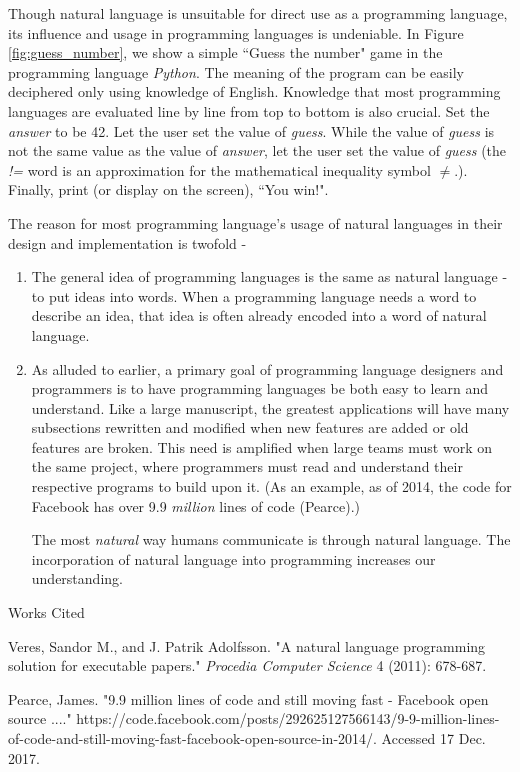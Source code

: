 \documentclass[12pt]{article}
\newcommand{\bibent}{\noindent \hangindent 40pt}
\newenvironment{workscited}{\newpage \begin{center} Works Cited \end{center}}{\newpage }
\begin{document}
\begin{flushleft}
Though natural language is unsuitable for direct use as a programming
language, its influence and usage in programming languages is undeniable.
In Figure \ref{fig:guess_number}, we show a simple ``Guess the number" game
in the programming language \textit{Python}.
The meaning of the program can be easily deciphered only using knowledge
of English. Knowledge that most programming languages are evaluated line
by line from top to bottom is also crucial. Set the \textit{answer} to be 42.
Let the user set the value of \textit{guess}.
While the value of \textit{guess} is not the same value
as the value of \textit{answer},
let the user set the value of \textit{guess} (the \textit{!=} word is an approximation
for the mathematical inequality symbol $\neq$.).
Finally, print (or display on the screen), ``You win!".

The reason for most programming language's usage of natural languages
in their design and implementation is twofold - 
\begin{enumerate}
\item The general idea of programming languages is the same as natural
language - to put ideas into words. When a programming language needs
a word to describe an idea, that idea is often already encoded into
a word of natural language.
\item As alluded to earlier, a primary goal of programming language
designers and programmers is to have programming languages be both easy to
learn and understand. Like a large manuscript, the greatest applications
will have many subsections rewritten and modified when new features are
added or old features are broken. This need is amplified when large
teams must work on the same project, where programmers must read and
understand their respective programs to build upon it.
(As an example, as of 2014, the code
for Facebook has over 9.9 \textit{million} lines of code (Pearce).)

The most \textit{natural} way humans communicate is through natural
language. The incorporation of natural language into programming
increases our understanding.
\end{enumerate}

\newpage

\begin{workscited}

\bibent
Veres, Sandor M., and J. Patrik Adolfsson. "A natural language programming solution for executable papers." \textit{Procedia Computer Science} 4 (2011): 678-687.

\bibent
Pearce, James. "9.9 million lines of code and still moving fast - Facebook open source ...." https://code.facebook.com/posts/292625127566143/9-9-million-lines-of-code-and-still-moving-fast-facebook-open-source-in-2014/. Accessed 17 Dec. 2017.

\end{workscited}

\end{flushleft}
\end{document}
